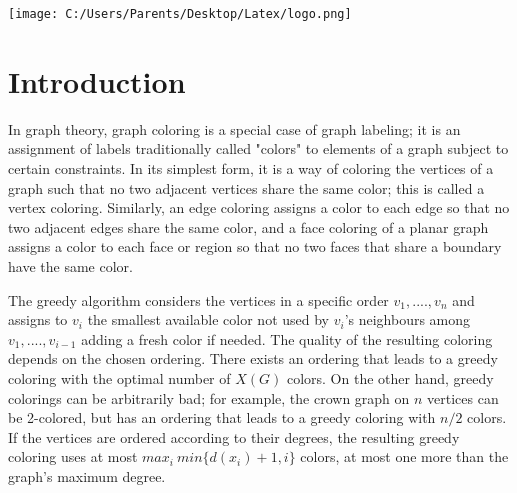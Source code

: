 \documentclass[a4paper,12pt]{article}
\begin{document}
\begin{titlepage}



\texttt{[image: C:/Users/Parents/Desktop/Latex/logo.png]}
 

\vfill %

\end{titlepage}

\newpage
\section{Introduction}
In graph theory, graph coloring is a special case of graph labeling; it is an assignment of labels traditionally called "colors" to elements of a graph subject to certain constraints. In its simplest form, it is a way of coloring the vertices of a graph such that no two adjacent vertices share the same color; this is called a vertex coloring. Similarly, an edge coloring assigns a color to each edge so that no two adjacent edges share the same color, and a face coloring of a planar graph assigns a color to each face or region so that no two faces that share a boundary have the same color.

The greedy algorithm considers the vertices in a specific order $ v_{1},...., v_{n}$ and assigns to $v_{i}$ the smallest available color not used by $v_{i}$’s neighbours among $v_{1},...., v_{i-1} $ adding a fresh color if needed. The quality of the resulting coloring depends on the chosen ordering. There exists an ordering that leads to a greedy coloring with the optimal number of $X(G)$ colors. On the other hand, greedy colorings can be arbitrarily bad; for example, the crown graph on $n$ vertices can be 2-colored, but has an ordering that leads to a greedy coloring with $n/2$ colors. If the vertices are ordered according to their degrees, the resulting greedy coloring uses at most $max_i\ min\{d(x_i)+1,i\}$ colors, at most one more than the graph’s maximum degree.
\newpage
\end{document}
